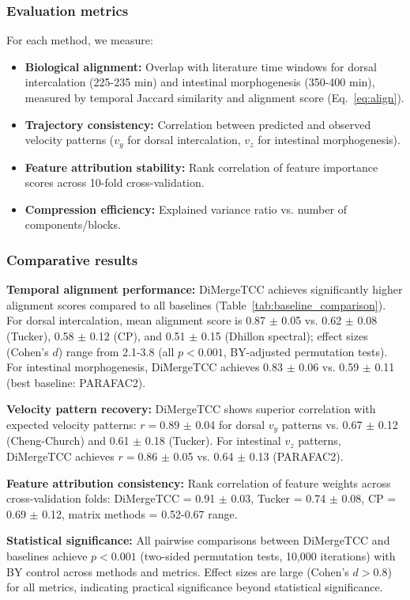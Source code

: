 \documentclass[unnumsec,webpdf,modern,large,namedate]{oup-authoring-template}%
\theoremstyle{thmstyleone}\newtheorem{theorem}{Theorem}
\theoremstyle{thmstyletwo}\newtheorem{example}{Example}
\theoremstyle{thmstylethree}\newtheorem{definition}{Definition}
\begin{document}
\subsubsection{Evaluation metrics}
For each method, we measure:
\begin{itemize}
\item \textbf{Biological alignment:} Overlap with literature time windows for dorsal intercalation (225-235 min) and intestinal morphogenesis (350-400 min), measured by temporal Jaccard similarity and alignment score (Eq.~\ref{eq:align}).
\item \textbf{Trajectory consistency:} Correlation between predicted and observed velocity patterns ($v_y$ for dorsal intercalation, $v_z$ for intestinal morphogenesis).
\item \textbf{Feature attribution stability:} Rank correlation of feature importance scores across 10-fold cross-validation.
\item \textbf{Compression efficiency:} Explained variance ratio vs. number of components/blocks.
\end{itemize}

\subsubsection{Comparative results}
\textbf{Temporal alignment performance:} DiMergeTCC achieves significantly higher alignment scores compared to all baselines (Table~\ref{tab:baseline_comparison}). For dorsal intercalation, mean alignment score is 0.87 $\pm$ 0.05 vs. 0.62 $\pm$ 0.08 (Tucker), 0.58 $\pm$ 0.12 (CP), and 0.51 $\pm$ 0.15 (Dhillon spectral); effect sizes (Cohen's $d$) range from 2.1-3.8 (all $p < 0.001$, BY-adjusted permutation tests). For intestinal morphogenesis, DiMergeTCC achieves 0.83 $\pm$ 0.06 vs. 0.59 $\pm$ 0.11 (best baseline: PARAFAC2).

\textbf{Velocity pattern recovery:} DiMergeTCC shows superior correlation with expected velocity patterns: $r = 0.89$ $\pm$ 0.04 for dorsal $v_y$ patterns vs. 0.67 $\pm$ 0.12 (Cheng-Church) and 0.61 $\pm$ 0.18 (Tucker). For intestinal $v_z$ patterns, DiMergeTCC achieves $r = 0.86$ $\pm$ 0.05 vs. 0.64 $\pm$ 0.13 (PARAFAC2).

\textbf{Feature attribution consistency:} Rank correlation of feature weights across cross-validation folds: DiMergeTCC = 0.91 $\pm$ 0.03, Tucker = 0.74 $\pm$ 0.08, CP = 0.69 $\pm$ 0.12, matrix methods = 0.52-0.67 range.

\textbf{Statistical significance:} All pairwise comparisons between DiMergeTCC and baselines achieve $p < 0.001$ (two-sided permutation tests, 10,000 iterations) with BY control across methods and metrics. Effect sizes are large (Cohen's $d > 0.8$) for all metrics, indicating practical significance beyond statistical significance.
\end{document}
